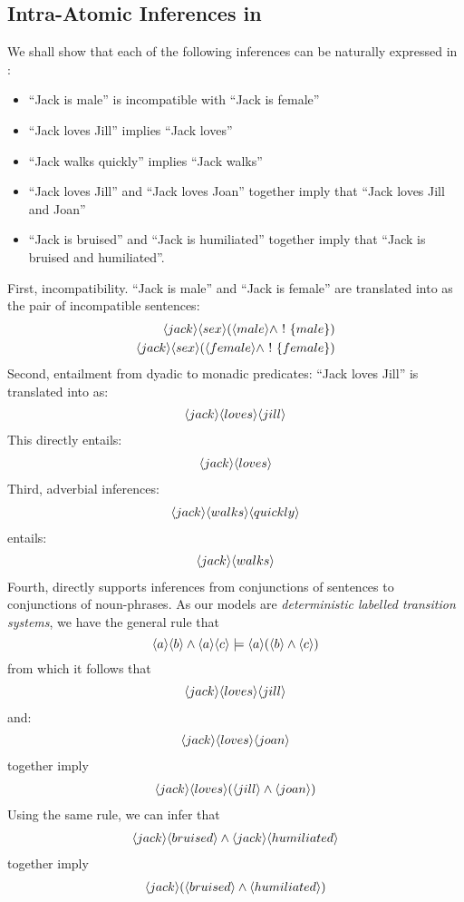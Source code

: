 \subsection{Intra-Atomic Inferences in \ELFULL{}}
We shall show that each of the following inferences can be naturally expressed in \ELABR{}:
\begin{itemize}
\item
``Jack is male'' is incompatible with ``Jack is female''
\item
``Jack loves Jill'' implies ``Jack loves''
\item
``Jack walks quickly'' implies ``Jack walks''
\item
``Jack loves Jill'' and ``Jack loves Joan'' together imply that ``Jack loves Jill and Joan''
\item
``Jack is bruised'' and ``Jack is humiliated'' together imply that ``Jack is bruised and humiliated''.
\end{itemize}
First, incompatibility. ``Jack is male'' and ``Jack is female'' are translated into \ELABR{} as the pair of incompatible sentences:
\begin{eqnarray*}
\langle jack \rangle \langle sex \rangle (\langle male \rangle \land \ ! \  \{male\}) \\
\langle jack \rangle \langle sex \rangle (\langle female \rangle \land \ ! \  \{female\})
\end{eqnarray*}
Second, entailment from dyadic to monadic predicates:
``Jack loves Jill'' is translated into \ELABR{} as:
\begin{eqnarray*}
\langle jack \rangle \langle loves \rangle \langle jill \rangle \end{eqnarray*}
This directly entails:
\begin{eqnarray*}
\langle jack \rangle \langle loves \rangle \end{eqnarray*}
Third, adverbial inferences: 
\begin{eqnarray*}
\langle jack \rangle \langle walks \rangle \langle quickly \rangle \end{eqnarray*}
entails:
\begin{eqnarray*}
\langle jack \rangle \langle walks \rangle \end{eqnarray*}
Fourth, \ELABR{} directly supports inferences from conjunctions of sentences to conjunctions of noun-phrases.
As our models are \emph{deterministic labelled transition systems}, we have the general rule that
\[
\langle a \rangle \langle b \rangle \land \langle a \rangle \langle c \rangle \models \langle a \rangle (\langle b \rangle \land \langle c \rangle )
\]
from which it follows that 
\begin{eqnarray*}
\langle jack \rangle \langle loves \rangle \langle jill \rangle \end{eqnarray*}
and:
\begin{eqnarray*}
\langle jack \rangle \langle loves \rangle \langle joan \rangle \end{eqnarray*}
together imply
\begin{eqnarray*}
\langle jack \rangle \langle loves \rangle (\langle jill \rangle \land \langle joan \rangle )
\end{eqnarray*}
Using the same rule, we can infer that
\begin{eqnarray*}
\langle jack \rangle \langle bruised \rangle \land \langle jack \rangle \langle humiliated \rangle \end{eqnarray*}
together imply
\begin{eqnarray*}
\langle jack \rangle (\langle bruised \rangle \land \langle humiliated \rangle )
\end{eqnarray*}
 
